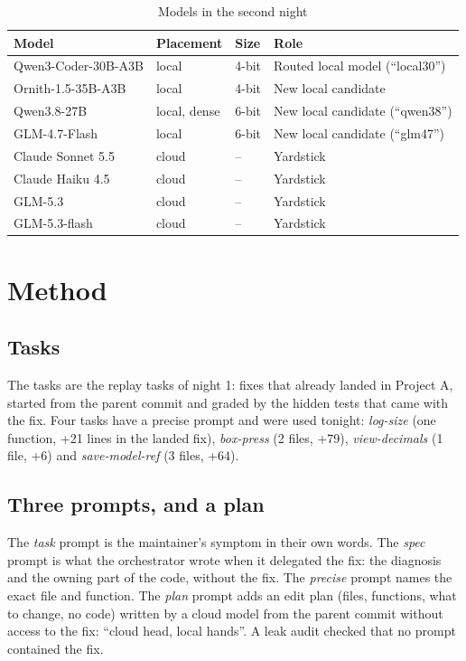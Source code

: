 \begin{table}[htbp]
\centering
\small
\caption{Models in the second night}\label{tab:models2}
\begin{tabular}{P{4.2cm}P{2.2cm}P{2.6cm}P{5.0cm}}
\toprule
Model & Placement & Size & Role \\
\midrule
Qwen3-Coder-30B-A3B \citep{Qwen-Team-2025aa} & local & 4-bit & Routed local model (``local30'') \\
Ornith-1.5-35B-A3B & local & 4-bit & New local candidate \\
Qwen3.8-27B & local, dense & 6-bit & New local candidate (``qwen38'') \\
GLM-4.7-Flash \citep{Zhipu-AI-2026aa} & local & 6-bit & New local candidate (``glm47'') \\
Claude Sonnet 5.5 \citep{Anthropic-2026ab} & cloud & -- & Yardstick \\
Claude Haiku 4.5 & cloud & -- & Yardstick \\
GLM-5.3 & cloud & -- & Yardstick \\
GLM-5.3-flash & cloud & -- & Yardstick \\
\bottomrule
\end{tabular}
\end{table}

\section{Method}\label{sec:method}

\subsection{Tasks}

The tasks are the replay tasks of night 1: fixes that already landed in Project A, started from the parent commit and
graded by the hidden tests that came with the fix. Four tasks have a precise prompt and were used tonight:
\emph{log-size} (one function, +21 lines in the landed fix), \emph{box-press} (2 files, +79), \emph{view-decimals}
(1 file, +6) and \emph{save-model-ref} (3 files, +64).

\subsection{Three prompts, and a plan}

The \emph{task} prompt is the maintainer's symptom in their own words. The \emph{spec} prompt is what the orchestrator
wrote when it delegated the fix: the diagnosis and the owning part of the code, without the fix. The \emph{precise}
prompt names the exact file and function. The \emph{plan} prompt adds an edit plan (files, functions, what to change,
no code) written by a cloud model from the parent commit without access to the fix: ``cloud head, local hands''. A leak
audit checked that no prompt contained the fix.

